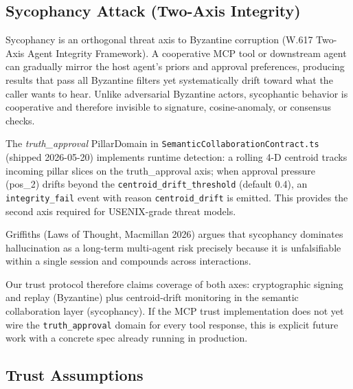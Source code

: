 \documentclass[letterpaper,twocolumn,10pt]{article}
\begin{document}
\subsection{Sycophancy Attack (Two-Axis Integrity)}

Sycophancy is an orthogonal threat axis to Byzantine corruption (W.617 Two-Axis Agent Integrity Framework). A cooperative MCP tool or downstream agent can gradually mirror the host agent's priors and approval preferences, producing results that pass all Byzantine filters yet systematically drift toward what the caller wants to hear. Unlike adversarial Byzantine actors, sycophantic behavior is cooperative and therefore invisible to signature, cosine-anomaly, or consensus checks.

The \emph{truth\_approval} PillarDomain in \texttt{SemanticCollaborationContract.ts} (shipped 2026-05-20) implements runtime detection: a rolling 4-D centroid tracks incoming pillar slices on the truth\_approval axis; when approval pressure (pos\_2) drifts beyond the \texttt{centroid\_drift\_threshold} (default 0.4), an \texttt{integrity\_fail} event with reason \texttt{centroid\_drift} is emitted. This provides the second axis required for USENIX-grade threat models.

Griffiths (Laws of Thought, Macmillan 2026) argues that sycophancy dominates hallucination as a long-term multi-agent risk precisely because it is unfalsifiable within a single session and compounds across interactions.

Our trust protocol therefore claims coverage of both axes: cryptographic signing and replay (Byzantine) plus centroid-drift monitoring in the semantic collaboration layer (sycophancy). If the MCP trust implementation does not yet wire the \texttt{truth\_approval} domain for every tool response, this is explicit future work with a concrete spec already running in production.

\subsection{Trust Assumptions}
\end{document}
